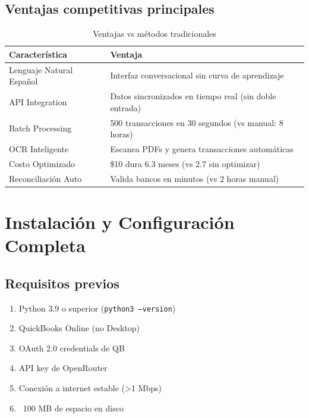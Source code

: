 \documentclass[12pt,oneside]{article}
\begin{document}
\subsection{Ventajas competitivas principales}

\begin{table}[h]
\centering
\begin{tabular}{|p{3cm}|p{9cm}|}
\hline
\textbf{Característica} & \textbf{Ventaja} \\
\hline
Lenguaje Natural Español & Interfaz conversacional sin curva de aprendizaje \\
\hline
API Integration & Datos sincronizados en tiempo real (sin doble entrada) \\
\hline
Batch Processing & 500 transacciones en 30 segundos (vs manual: 8 horas) \\
\hline
OCR Inteligente & Escanea PDFs y genera transacciones automáticas \\
\hline
Costo Optimizado & \$10 dura 6.3 meses (vs 2.7 sin optimizar) \\
\hline
Reconciliación Auto & Valida bancos en minutos (vs 2 horas manual) \\
\hline
\end{tabular}
\caption{Ventajas vs métodos tradicionales}
\end{table}

\newpage

\section{Instalación y Configuración Completa}

\subsection{Requisitos previos}

\begin{tcolorbox}[colback=yellow!10, colframe=accent, boxrule=1.5pt]
    \begin{enumerate}[leftmargin=*]
        \item Python 3.9 o superior (\texttt{python3 --version})
        \item QuickBooks Online (no Desktop)
        \item OAuth 2.0 credentials de QB
        \item API key de OpenRouter
        \item Conexión a internet estable (>1 Mbps)
        \item ~100 MB de espacio en disco
    \end{enumerate}
\end{tcolorbox}
\end{document}
